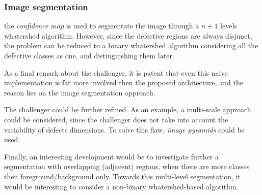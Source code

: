 \subsubsection{Image segmentation}\label{section:challenger:image-segmentation}
\par{
	the \emph{confidence map} is used to segmentate the image through a $n+1$ levels whatershed algorithm. However, since the defective regions are always disjunct, the problem can be reduced to a binary whatershed algorithm \cite{ieee:87344} considering all the defective classes as one, and distinguishing them later.
}
\par{
	As a final remark about the challenger, it is patent that even this naive implementation is far more involved then the proposed architecture, and the reason lies on the image segmentation approach.
}
\par{
	The challenger could be further refined. As an example, a multi-scale approach could be considered, since the challenger does not take into account the variability of defects dimensions. To solve this flaw, \emph{image pyramids} could be used.
}
\par{
	Finally, an interesting development would be to investigate further a segmentation with overlapping (adjacent) regions, when there are more classes then foreground/background only. Towards this multi-level segmentation, it would be interesting to consider a non-binary whatershed-based algorithm.
}